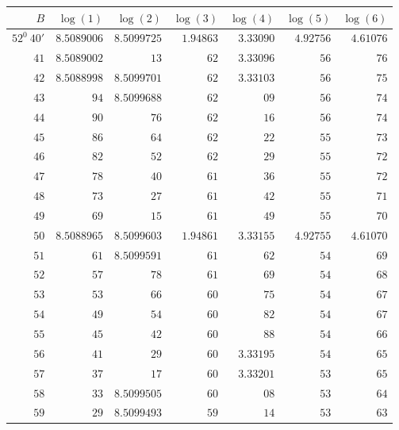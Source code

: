 \clearpage
{}
\begingroup
\fontsize{8}{9}\selectfont
\setlength{\tabcolsep}{5pt}
\renewcommand{\arraystretch}{1.09}
\begin{center}
\begin{tabular}{||r||r|r|r|r|r|r||}
\hline\hline
\(B\)&\(\log(1)\)&\(\log(2)\)&\(\log(3)\)&\(\log(4)\)&\(\log(5)\)&\(\log(6)\)\\
\hline
\(52^0\ 40'\) & \(8.5089006\) & \(8.5099725\) & \(1.94863\) & \(3.33090\) & \(4.92756\) & \(4.61076\)\\
\(41\) & \(8.5089002\) & \(13\) & \(62\) & \(3.33096\) & \(56\) & \(76\)\\
\(42\) & \(8.5088998\) & \(8.5099701\) & \(62\) & \(3.33103\) & \(56\) & \(75\)\\
\(43\) & \(94\) & \(8.5099688\) & \(62\) & \(09\) & \(56\) & \(74\)\\
\(44\) & \(90\) & \(76\) & \(62\) & \(16\) & \(56\) & \(74\)\\
\(45\) & \(86\) & \(64\) & \(62\) & \(22\) & \(55\) & \(73\)\\
\(46\) & \(82\) & \(52\) & \(62\) & \(29\) & \(55\) & \(72\)\\
\(47\) & \(78\) & \(40\) & \(61\) & \(36\) & \(55\) & \(72\)\\
\(48\) & \(73\) & \(27\) & \(61\) & \(42\) & \(55\) & \(71\)\\
\(49\) & \(69\) & \(15\) & \(61\) & \(49\) & \(55\) & \(70\)\\[3pt]
\(50\) & \(8.5088965\) & \(8.5099603\) & \(1.94861\) & \(3.33155\) & \(4.92755\) & \(4.61070\)\\
\(51\) & \(61\) & \(8.5099591\) & \(61\) & \(62\) & \(54\) & \(69\)\\
\(52\) & \(57\) & \(78\) & \(61\) & \(69\) & \(54\) & \(68\)\\
\(53\) & \(53\) & \(66\) & \(60\) & \(75\) & \(54\) & \(67\)\\
\(54\) & \(49\) & \(54\) & \(60\) & \(82\) & \(54\) & \(67\)\\
\(55\) & \(45\) & \(42\) & \(60\) & \(88\) & \(54\) & \(66\)\\
\(56\) & \(41\) & \(29\) & \(60\) & \(3.33195\) & \(54\) & \(65\)\\
\(57\) & \(37\) & \(17\) & \(60\) & \(3.33201\) & \(53\) & \(65\)\\
\(58\) & \(33\) & \(8.5099505\) & \(60\) & \(08\) & \(53\) & \(64\)\\
\(59\) & \(29\) & \(8.5099493\) & \(59\) & \(14\) & \(53\) & \(63\)\\[3pt]

\end{tabular}
\end{center}
